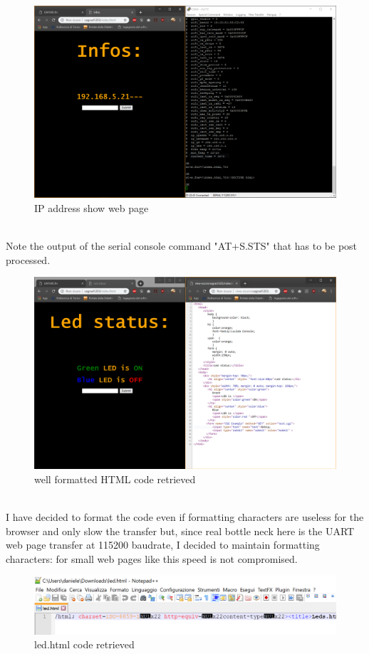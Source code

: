 \documentclass[peerreview]{IEEEtran}
\begin{document}
\begin{figure}[!ht]
\centering
\includegraphics[width=0.8\columnwidth]{4}
\caption{IP address show web page}
\label{fig_IP}
\end{figure}
\\Note the output of the serial console command "AT+S.STS" that has to be post processed.\\
\begin{figure}[!ht]
\centering
\includegraphics[width=0.8\columnwidth]{5}
\caption{well formatted HTML code retrieved}
\label{fig_HTML}
\end{figure}
\\I have decided to format the code even if formatting characters are useless for the browser and only slow the transfer but, since real bottle neck here is the UART web page transfer at 115200 baudrate, I decided to maintain formatting characters: for small web pages like this speed is not compromised.
\begin{figure}[!h]
\centering
\includegraphics[width=0.8\columnwidth]{8}
\caption{led.html code retrieved}
\label{fig_led}
\end{figure}
\end{document}

